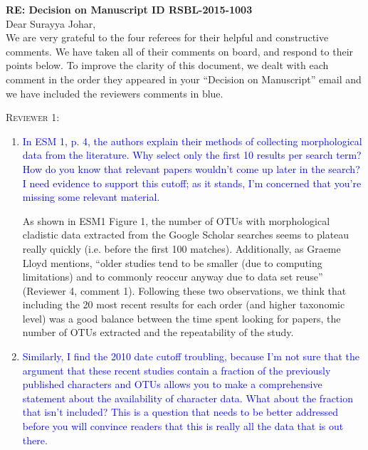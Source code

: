 \documentclass[12pt,letterpaper]{article}
\renewcommand{\section}[1]{%
\bigskip
\begin{center}
\begin{Large}
\normalfont\scshape #1
\medskip
\end{Large}
\end{center}}
\begin{document}
\textbf{RE: Decision on Manuscript ID RSBL-2015-1003}\\
\bigskip
Dear Surayya Johar,\\
\bigskip
We are very grateful to the four referees for their helpful and constructive comments. %
We have taken all of their comments on board, and respond to their points below. To improve the clarity of this document, we dealt with each comment in the order they appeared in your ``Decision on Manuscript'' email and we have included the reviewers comments in blue.


\section{Reviewer 1:}
\begin{enumerate}
\item{\textcolor{blue}{In ESM 1, p. 4, the authors explain their methods of collecting morphological data from the literature. Why select only the first 10 results per search term? How do you know that relevant papers wouldn't come up later in the search? I need evidence to support this cutoff; as it stands, I'm concerned that you're missing some relevant material.}}

As shown in ESM1 Figure 1, the number of OTUs with morphological cladistic data extracted from the Google Scholar searches seems to plateau really quickly (i.e. before the first 100 matches).
Additionally, as Graeme Lloyd mentions, ``older studies tend to be smaller (due to computing limitations) and to commonly reoccur anyway due to data set reuse'' (Reviewer 4, comment 1).
Following these two observations, we think that including the 20 most recent results %
 for each order (and higher taxonomic level) was a good balance between the time spent looking for papers, the number of OTUs extracted and the repeatability of the study.

\item{\textcolor{blue}{Similarly, I find the 2010 date cutoff troubling, because I'm not sure that the argument that these recent studies contain a fraction of the previously published characters and OTUs allows you to make a comprehensive statement about the availability of character data. What about the fraction that isn't included? This is a question that needs to be better addressed before you will convince readers that this is really all the data that is out there.}}


\end{enumerate}
\end{document}
